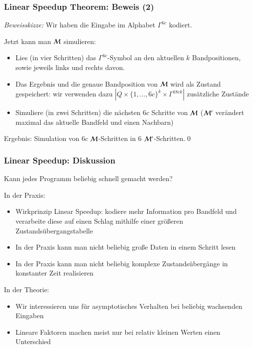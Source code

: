 \documentclass[aspectratio=1610,onlymath]{beamer}
\begin{document}
\begin{frame}\frametitle{Linear Speedup Theorem: Beweis (2)}


\emph{Beweisskizze:} Wir haben die Eingabe im Alphabet $\Gamma^{6c}$ kodiert.
\pause\medskip

Jetzt kann man $\mathcal{M}$ simulieren:
\begin{itemize}
\item Lies (in vier Schritten) das $\Gamma^{6c}$-Symbol an den aktuellen $k$ Bandpositionen,
sowie jeweils links und rechts davon. 
\item Das Ergebnis und die genaue Bandposition von $\mathcal{M}$ wird als Zustand gespeichert: wir verwenden dazu
$|Q\times\{1,\ldots,6c\}^k\times \Gamma^{18c k}|$ zusätzliche Zustände
\item Simuliere (in zwei Schritten) die nächsten $6c$ Schritte von $\mathcal{M}$
($\mathcal{M}'$ verändert maximal das aktuelle Bandfeld und einen Nachbarn)
\end{itemize}
Ergebnis: Simulation von $6c$ $\mathcal{M}$-Schritten in $6$ $\mathcal{M}'$-Schritten.\qed

\end{frame}

\begin{frame}\frametitle{Linear Speedup: Diskussion}

\alert{Kann jedes Programm beliebig schnell gemacht werden?}\bigskip\pause

In der Praxis: 
\begin{itemize}
\item Wirkprinzip Linear Speedup: kodiere mehr Information pro Bandfeld und verarbeite
diese auf einen Schlag mithilfe einer größeren Zustandsübergangstabelle
\item In der Praxis kann man nicht beliebig große Daten in einem Schritt lesen
\item In der Praxis kann man nicht beliebig komplexe Zustandsübergänge in konstanter
Zeit realisieren
\end{itemize}
\bigskip\pause

In der Theorie: 
\begin{itemize}
\item Wir interessieren uns für asymptotisches Verhalten bei beliebig wachsenden
	Eingaben
\item Lineare Faktoren machen meist nur bei relativ kleinen Werten einen Unterschied
\end{itemize}

\end{frame}
\end{document}
